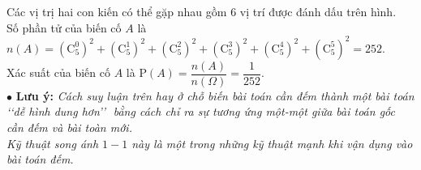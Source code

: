 \begin{vd}
{		Các vị trị hai con kiến có thể gặp nhau gồm $6$ vị trí được đánh dấu trên hình.\\
		Số phần tử của biến cố $A$ là $n(A)=\left(\mathrm{C}_5^0\right)^2+\left(\mathrm{C}_5^1\right)^2+\left(\mathrm{C}_5^2\right)^2+\left(\mathrm{C}_5^3\right)^2+\left(\mathrm{C}_5^4\right)^2+\left(\mathrm{C}_5^5\right)^2=252$.\\
		Xác suất của biến cố $A$ là $\mathrm{P}\left(A\right)=\dfrac{n(A)}{n(\Omega)}=\dfrac{1}{252}$.\\
		$\bullet$ \textbf{Lưu ý:} \textit{Cách suy luận trên hay ở chỗ biến bài toán cần đếm thành một bài toán \lq\lq dễ hình dung hơn\rq\rq\,\, bằng cách chỉ ra sự tương ứng một-một giữa bài toán gốc cần đếm và bài toàn mới.\\
			Kỹ thuật song ánh $1-1$ này là một trong những kỹ thuật mạnh khi vận dụng vào bài toán đếm.}
	}
\end{vd}
